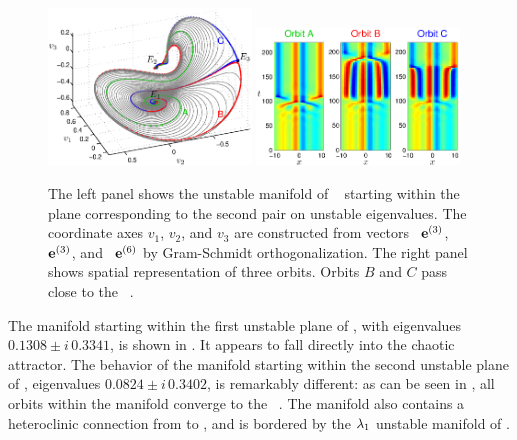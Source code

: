 \begin{figure}[t]
\begin{center}
\includegraphics[width=0.48\textwidth]{figs/ks22_E1_plane2_manifold_c.eps}
\includegraphics[width=0.48\textwidth]{figs/ks22_E1_plane2_orbits_c.eps}
\end{center}
\caption{
The left panel shows the unstable
manifold of \eqv\  starting within the plane
corresponding to the second pair on unstable eigenvalues. The
coordinate axes $v_1$, $v_2$, and $v_3$ are constructed from vectors
\Re\, $\jEigvec{3}$, \Im\, $\jEigvec{3}$, and \Re\, $\jEigvec{6}$
by Gram-Schmidt orthogonalization.
The right panel shows spatial representation of three orbits. Orbits
$B$ and $C$ pass close to the \eqv\ .
   }
\label{f:KS22E1man2}
\end{figure}

The manifold starting within the first unstable plane of , with
eigenvalues $0.1308\pm i\, 0.3341$, is shown in
. It appears to fall directly into the
chaotic attractor.  The behavior of the manifold starting within
the second unstable plane of , eigenvalues $0.0824\pm i \, 0.3402$, is
remarkably different: as can be seen in ,
all orbits within the manifold converge to the \eqv\ .  The
manifold also contains a heteroclinic connection from  to ,
and is bordered by the $\eigExp[1]$ unstable manifold of .

